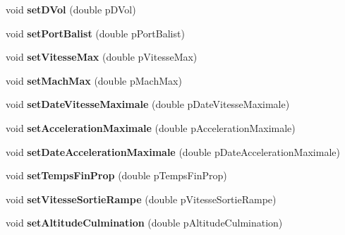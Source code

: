 \begin{DoxyCompactItemize}
void {\bfseries set\+D\+Vol} (double p\+D\+Vol)
\item 
\mbox{\label{classpackage_i_h_m_1_1_fusee_ab9d6b405e661e93354c9601f4f5af296}} 
void {\bfseries set\+Port\+Balist} (double p\+Port\+Balist)
\item 
\mbox{\label{classpackage_i_h_m_1_1_fusee_a005fe536e830e1823e624314eff9b543}} 
void {\bfseries set\+Vitesse\+Max} (double p\+Vitesse\+Max)
\item 
\mbox{\label{classpackage_i_h_m_1_1_fusee_a09712bc7d39d33d86a7f0e792afe8e81}} 
void {\bfseries set\+Mach\+Max} (double p\+Mach\+Max)
\item 
\mbox{\label{classpackage_i_h_m_1_1_fusee_ab89fbbe48028772ed7edead723202629}} 
void {\bfseries set\+Date\+Vitesse\+Maximale} (double p\+Date\+Vitesse\+Maximale)
\item 
\mbox{\label{classpackage_i_h_m_1_1_fusee_a6184007212fa89f33da93d80d703350e}} 
void {\bfseries set\+Acceleration\+Maximale} (double p\+Acceleration\+Maximale)
\item 
\mbox{\label{classpackage_i_h_m_1_1_fusee_a583bc99f76ddf6c953cf3b30f3107e6b}} 
void {\bfseries set\+Date\+Acceleration\+Maximale} (double p\+Date\+Acceleration\+Maximale)
\item 
\mbox{\label{classpackage_i_h_m_1_1_fusee_a726c750ee19c46330a25cc8b2249e3e5}} 
void {\bfseries set\+Temps\+Fin\+Prop} (double p\+Temps\+Fin\+Prop)
\item 
\mbox{\label{classpackage_i_h_m_1_1_fusee_a27e69a56a97f41a42ab689da8b787d97}} 
void {\bfseries set\+Vitesse\+Sortie\+Rampe} (double p\+Vitesse\+Sortie\+Rampe)
\item 
\mbox{\label{classpackage_i_h_m_1_1_fusee_a96839656a0cb81be493e3ef2a1af2302}} 
void {\bfseries set\+Altitude\+Culmination} (double p\+Altitude\+Culmination)
\item 
\mbox{\label{classpackage_i_h_m_1_1_fusee_a99ac0271424ea4a3d34c2e3c3d843164}} 

\end{DoxyCompactItemize}
